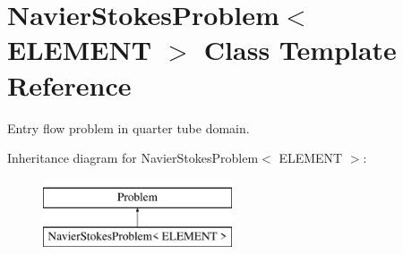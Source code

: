 \hypertarget{classNavierStokesProblem}{}\section{Navier\+Stokes\+Problem$<$ E\+L\+E\+M\+E\+NT $>$ Class Template Reference}
\label{classNavierStokesProblem}


Entry flow problem in quarter tube domain.  


Inheritance diagram for Navier\+Stokes\+Problem$<$ E\+L\+E\+M\+E\+NT $>$\+:\begin{figure}[H]
\begin{center}
\leavevmode
\includegraphics[height=2.000000cm]{classNavierStokesProblem}
\end{center}
\end{figure}
